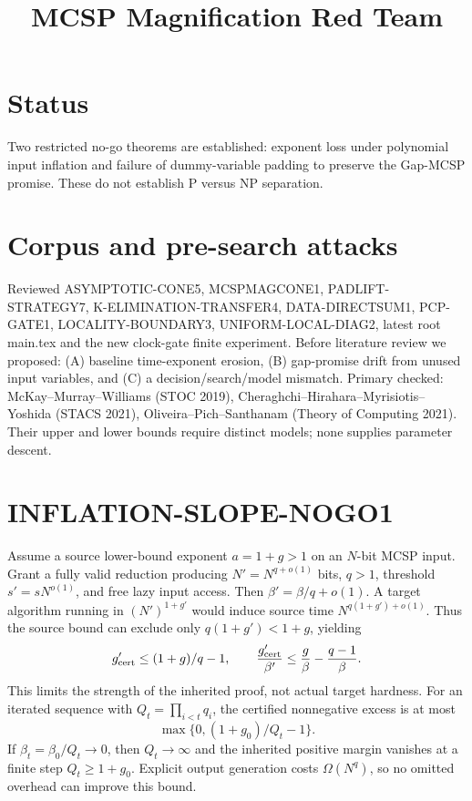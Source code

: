 \documentclass{article}
\title{MCSP Magnification Red Team}
\begin{document}
\maketitle
\section{Status}
Two restricted no-go theorems are established: exponent loss under polynomial input inflation and failure of dummy-variable padding to preserve the Gap-MCSP promise. These do not establish P versus NP separation.

\section{Corpus and pre-search attacks}
Reviewed ASYMPTOTIC-CONE5, MCSPMAGCONE1, PADLIFT-STRATEGY7, K-ELIMINATION-TRANSFER4, DATA-DIRECTSUM1, PCP-GATE1, LOCALITY-BOUNDARY3, UNIFORM-LOCAL-DIAG2, latest root main.tex and the new clock-gate finite experiment. Before literature review we proposed: (A) baseline time-exponent erosion, (B) gap-promise drift from unused input variables, and (C) a decision/search/model mismatch. Primary checked: McKay--Murray--Williams (STOC 2019), Cheraghchi--Hirahara--Myrisiotis--Yoshida (STACS 2021), Oliveira--Pich--Santhanam (Theory of Computing 2021). Their upper and lower bounds require distinct models; none supplies parameter descent.

\section{INFLATION-SLOPE-NOGO1}
Assume a source lower-bound exponent $a=1+g>1$ on an $N$-bit MCSP input. Grant a fully valid reduction producing $N'=N^{q+o(1)}$ bits, $q>1$, threshold $s'=sN^{o(1)}$, and free lazy input access. Then $\beta'=\beta/q+o(1)$. A target algorithm running in $(N')^{1+g'}$ would induce source time $N^{q(1+g')+o(1)}$. Thus the source bound can exclude only $q(1+g')<1+g$, yielding
\[
g'_{\rm cert}\le (1+g)/q-1,\qquad
\frac{g'_{\rm cert}}{\beta'}\le \frac{g}{\beta}-\frac{q-1}{\beta}.
\]
This limits the strength of the inherited proof, not actual target hardness. For an iterated sequence with $Q_t=\prod_{i<t}q_i$, the certified nonnegative excess is at most
\[
\max\{0,(1+g_0)/Q_t-1\}.
\]
If $\beta_t=\beta_0/Q_t\to0$, then $Q_t\to\infty$ and the inherited positive margin vanishes at a finite step $Q_t\ge1+g_0$. Explicit output generation costs $\Omega(N^q)$, so no omitted overhead can improve this bound.
\end{document}
